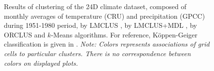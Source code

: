 {\begin{figure}[ht]
{    \label{fig:cl-kmeans}}
\hspace*{-15pt}
\hspace*{0.25\textwidth}
\caption{
    Results of clustering of the 24D climate dataset, composed of monthly
    averages of temperature (CRU) and precipitation (GPCC) during 1951-1980
    period, by LMCLUS , by LMCLUS+MDL ,
    by ORCLUS  and $k$-Means 
    algorithms. For reference, K{\"o}ppen-Geiger classification is given in .
    \emph{Note: Colors represents associations of grid cells to particular
    clusters. There is no correspondence between colors on displayed plots.}
}
\label{fig:cl-climate}
\end{figure}
}

